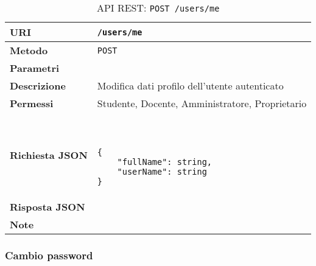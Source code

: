         \begin{table}[H]
            \begin{center}
                \begin{tabular}{p{} p{}}
                    \toprule
                    \textbf{URI} & \texttt{/users/me} \\ \midrule
                    \textbf{Metodo} & \texttt{POST} \\ \midrule
                    \textbf{Parametri} & \\ \midrule
                    \textbf{Descrizione} & Modifica dati profilo dell'utente autenticato \\ \midrule
                    \textbf{Permessi} & Studente, Docente, Amministratore, Proprietario  \\ \midrule
                    \textbf{Richiesta JSON} & \
                        \begin{lstlisting}[basicstyle={\ttfamily}]
{
    "fullName": string,
    "userName": string
}
                        \end{lstlisting}
                        \\ \midrule
                    \textbf{Risposta JSON} & \\ \midrule
                    \textbf{Note} & \\
                    \bottomrule
                \end{tabular}
                \caption{API REST: \texttt{POST /users/me}}
            \end{center}
        \end{table}

    \subsubsection{Cambio password}

